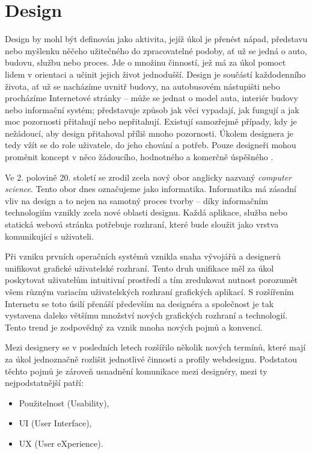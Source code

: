 \chapter{Design}
\label{chap:design}

Design by mohl být definován jako aktivita, jejíž úkol je přenést nápad, představu nebo myšlenku něčeho užitečného do zpracovatelné podoby, ať už se jedná o auto, budovu, službu nebo proces. Jde o množinu činností, jež má za úkol pomoct lidem v orientaci a učinit jejich život jednodušší. Design je součástí každodenního života, ať už se nacházíme uvnitř budovy, na autobusovém nástupišti nebo procházíme Internetové stránky -- může se jednat o model auta, interiér budovy nebo informační systém; představuje způsob jak věci vypadají, jak fungují a jak moc pozornosti přitahují nebo nepřitahují. Existují samozřejmě případy, kdy je nežádoucí, aby design přitahoval příliš mnoho pozornosti. Úkolem designera je tedy vžít se do role uživatele, do jeho chování a potřeb. Pouze designeři mohou proměnit koncept v něco žádoucího, hodnotného a komerčně úspěšného \cite{8}.

Ve 2. polovině 20. století se zrodil zcela nový obor anglicky nazvaný \textit{computer science}. Tento obor dnes označujeme jako informatika. Informatika má zásadní vliv na design a to nejen na samotný proces tvorby -- díky informačním technologiím vznikly zcela nové oblasti designu. Každá aplikace, služba nebo statická webová stránka potřebuje rozhraní, které bude sloužit jako vrstva komunikující s uživateli.

Při vzniku prvních operačních systémů vznikla snaha vývojářů a designerů unifikovat grafické uživatelské rozhraní. Tento druh unifikace měl za úkol poskytovat uživatelům intuitivní prostředí a tím zredukovat nutnost porozumět všem různým variacím uživatelských rozhraní grafických aplikací. S rozšířením Internetu se toto úsilí přenáší především na designéra a společnost je tak vystavena daleko většímu množství nových grafických rozhraní a technologií. Tento trend je zodpovědný za vznik mnoha nových pojmů a konvencí.

Mezi designery se v posledních letech rozšířilo několik nových termínů, které mají za úkol jednoznačně rozlišit jednotlivé činnosti a profily webdesignu. Podstatou těchto pojmů je zároveň usnadnění komunikace mezi designéry, mezi ty nejpodstatnější patří:

\begin{itemize}
    \item Použitelnost (Usability),
    \item UI (User Interface),
    \item UX (User eXperience).
\end{itemize}

